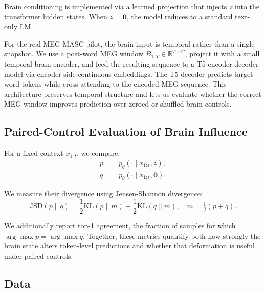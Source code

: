 \documentclass{article}
\theoremstyle{plain}
\theoremstyle{definition}
\theoremstyle{remark}
\begin{document}
Brain conditioning is implemented via a learned projection that injects $z$ into the transformer hidden states.
When $z=\mathbf{0}$, the model reduces to a standard text-only LM.

For the real MEG-MASC pilot, the brain input is temporal rather than a single snapshot.
We use a post-word MEG window $B_{1:T}\in\mathbb{R}^{T\times C}$, project it with a small temporal brain encoder, and feed the resulting sequence to a T5 encoder-decoder model via encoder-side continuous embeddings.
The T5 decoder predicts target word tokens while cross-attending to the encoded MEG sequence.
This architecture preserves temporal structure and lets us evaluate whether the correct MEG window improves prediction over zeroed or shuffled brain controls.






\subsection{Paired-Control Evaluation of Brain Influence}


For a fixed context $x_{1:t}$, we compare:
\begin{align}
p &= p_\theta(\cdot \mid x_{1:t}, z), \\
q &= p_\theta(\cdot \mid x_{1:t}, \mathbf{0}).
\end{align}

We measure their divergence using Jensen-Shannon divergence:
\begin{equation}
\mathrm{JSD}(p \parallel q) = \frac{1}{2}\mathrm{KL}(p \parallel m) + \frac{1}{2}\mathrm{KL}(q \parallel m),
\quad m = \tfrac{1}{2}(p+q).
\end{equation}

We additionally report top-1 agreement, the fraction of samples for which $\arg\max p = \arg\max q$.
Together, these metrics quantify both how strongly the brain state alters token-level predictions and whether that deformation is useful under paired controls.




\subsection{Data}
\end{document}
